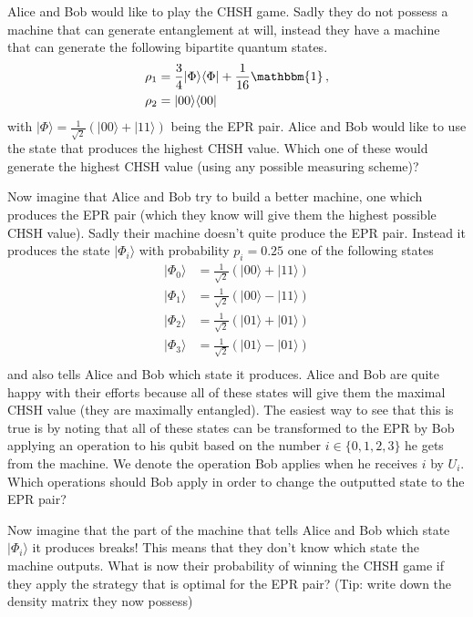 \documentclass[a4paper,10pt,landscape,twocolumn]{scrartcl}
\newcommand{\ket}[1]{| #1 \rangle}
\newcommand{\bra}[1]{\langle #1 |}
\begin{document}
\begin{exercise}

\begin{subex}
Alice and Bob would like to play the CHSH game. Sadly they do not possess a machine that can generate entanglement at will, instead they have a machine that can generate the following bipartite quantum states.
\begin{align*}
\rho_1 &= \frac{3}{4}\ket{\Phi}\bra{\Phi} + \frac{1}{16} \mathbbm{1} \, , \\
\rho_2 &= \ket{00}\bra{00}
\end{align*}
with $\ket{\Phi} = \frac{1}{\sqrt{2}} (\ket{00} + \ket{11})$ being the EPR pair. Alice and Bob would like to use the state that produces the highest CHSH value. Which one of these would generate the highest CHSH value (using any possible measuring scheme)?
\end{subex}

\begin{subex}
Now imagine that Alice and Bob try to build a better machine, one which produces the EPR pair (which they know will give them the highest possible CHSH value). Sadly their machine doesn't quite produce the EPR pair. Instead it produces the state $\ket{\Phi_i}$ with probability $p_i=0.25$ one of the following states
\begin{align*}
\ket{\Phi_0} &= \frac{1}{\sqrt{2}} ( \ket{00} + \ket{11} ) \\
\ket{\Phi_1} &= \frac{1}{\sqrt{2}} ( \ket{00} - \ket{11} ) \\
\ket{\Phi_2} &= \frac{1}{\sqrt{2}} ( \ket{01} + \ket{01} ) \\
\ket{\Phi_3} &= \frac{1}{\sqrt{2}} ( \ket{01} - \ket{01} ) \\
\end{align*}
and also tells Alice and Bob which state it produces. Alice and Bob are quite happy with their efforts because all of these states will give them the maximal CHSH value (they are maximally entangled). The easiest way to see that this is true is by noting that all of these states can be transformed to the EPR by Bob applying an operation to his qubit based on the number $i \in \{0,1,2,3\}$ he gets from the machine. We denote the operation Bob applies when he receives $i$ by $U_i$. Which operations should Bob apply in order to change the outputted state to the EPR pair?
\end{subex}

\begin{subex}
Now imagine that the part of the machine that tells Alice and Bob which state $\ket{\Phi_i}$ it produces breaks! This means that they don't know which state the machine outputs. What is now their probability of winning the CHSH game if they apply the strategy that is optimal for the EPR pair? (Tip: write down the density matrix they now possess)
\end{subex}
\end{exercise}
\end{document}
